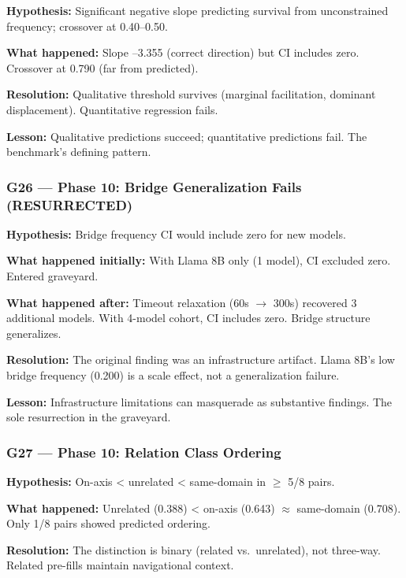 \textbf{Hypothesis:} Significant negative slope predicting survival from unconstrained frequency; crossover at 0.40--0.50.

\textbf{What happened:} Slope --3.355 (correct direction) but CI includes zero. Crossover at 0.790 (far from predicted).

\textbf{Resolution:} Qualitative threshold survives (marginal facilitation, dominant displacement). Quantitative regression fails.

\textbf{Lesson:} Qualitative predictions succeed; quantitative predictions fail. The benchmark's defining pattern.

\subsubsection{G26 --- Phase 10: Bridge Generalization Fails (RESURRECTED)}\label{g26-phase-10-bridge-generalization-fails-resurrected}

\textbf{Hypothesis:} Bridge frequency CI would include zero for new models.

\textbf{What happened initially:} With Llama 8B only (1 model), CI excluded zero. Entered graveyard.

\textbf{What happened after:} Timeout relaxation (60s \(\to\) 300s) recovered 3 additional models. With 4-model cohort, CI includes zero. Bridge structure generalizes.

\textbf{Resolution:} The original finding was an infrastructure artifact. Llama 8B's low bridge frequency (0.200) is a scale effect, not a generalization failure.

\textbf{Lesson:} Infrastructure limitations can masquerade as substantive findings. The sole resurrection in the graveyard.

\subsubsection{G27 --- Phase 10: Relation Class Ordering}\label{g27-phase-10-relation-class-ordering}

\textbf{Hypothesis:} On-axis \textless{} unrelated \textless{} same-domain in \(\geq\) 5/8 pairs.

\textbf{What happened:} Unrelated (0.388) \textless{} on-axis (0.643) \(\approx\) same-domain (0.708). Only 1/8 pairs showed predicted ordering.

\textbf{Resolution:} The distinction is binary (related vs.~unrelated), not three-way. Related pre-fills maintain navigational context.

